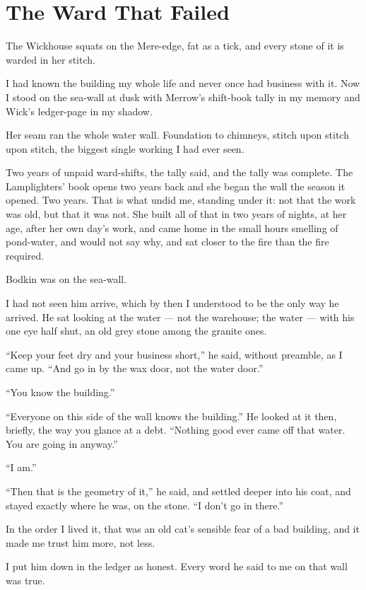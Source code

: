 \chapter{The Ward That Failed}

The Wickhouse squats on the Mere-edge, fat as a tick, and every stone of it is warded in her stitch.

I had known the building my whole life and never once had business with it. Now I stood on the sea-wall at dusk with Merrow's shift-book tally in my memory and Wick's ledger-page in my shadow.

Her seam ran the whole water wall. Foundation to chimneys, stitch upon stitch upon stitch, the biggest single working I had ever seen.

Two years of unpaid ward-shifts, the tally said, and the tally was complete. The Lamplighters' book opens two years back and she began the wall the season it opened. Two years. That is what undid me, standing under it: not that the work was old, but that it was not. She built all of that in two years of nights, at her age, after her own day's work, and came home in the small hours smelling of pond-water, and would not say why, and sat closer to the fire than the fire required.

Bodkin was on the sea-wall.

I had not seen him arrive, which by then I understood to be the only way he arrived. He sat looking at the water --- not the warehouse; the water --- with his one eye half shut, an old grey stone among the granite ones.

``Keep your feet dry and your business short,'' he said, without preamble, as I came up. ``And go in by the wax door, not the water door.''

``You know the building.''

``Everyone on this side of the wall knows the building.'' He looked at it then, briefly, the way you glance at a debt. ``Nothing good ever came off that water. You are going in anyway.''

``I am.''

``Then that is the geometry of it,'' he said, and settled deeper into his coat, and stayed exactly where he was, on the stone. ``I don't go in there.''

In the order I lived it, that was an old cat's sensible fear of a bad building, and it made me trust him more, not less.

I put him down in the ledger as honest. Every word he said to me on that wall was true.


